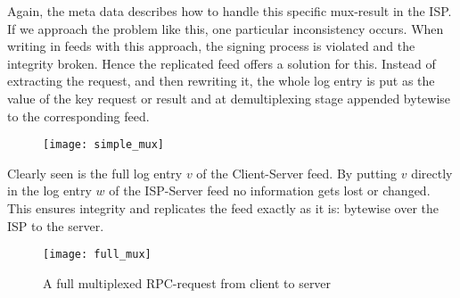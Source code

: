 Again, the meta data describes how to handle this specific mux-result in the ISP. If we approach the problem like this, one particular inconsistency occurs. When writing in feeds with this approach, the signing process is violated and the integrity broken. Hence the replicated feed offers a solution for this. Instead of extracting the request, and then rewriting it, the whole log entry is put as the value of the key request or result and at demultiplexing stage appended bytewise to the corresponding feed.\\
\begin{figure}
    \centering
    \texttt{[image: simple\_mux]}
    \label{fig:simplemux}
\end{figure}


Clearly seen is the full log entry $v$ of the Client-Server feed. By putting $v$ directly in the log entry $w$ of the ISP-Server feed no information gets lost or changed. This ensures integrity and replicates the feed exactly as it is: bytewise over the ISP to the server. 
\begin{figure}
    \centering
    \texttt{[image: full\_mux]}
    \caption{A full multiplexed RPC-request from client to server}
    \label{fig:fullmux}
\end{figure}